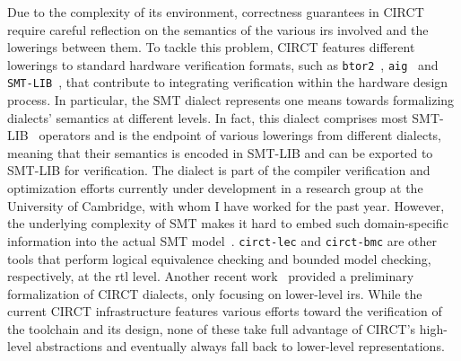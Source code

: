 \documentclass[sigconf,authorversion,nonacm, 11pt]{acmart}
\begin{document}
Due to the complexity of its environment, correctness guarantees in CIRCT require careful reflection on the semantics of the various \acp{ir} involved and the lowerings between them. 
To tackle this problem, CIRCT features different lowerings to standard hardware verification formats, such as \texttt{btor2}~\cite{btor2, niemetz2018btor2}, \texttt{aig}~\cite{aiger2} and \texttt{SMT-LIB}~\cite{barrett2010smt}, 
that contribute to integrating verification within the hardware design process.
In particular, the SMT dialect represents one means towards formalizing dialects' semantics at different levels. 
In fact, this dialect comprises most SMT-LIB~\cite{barrett2010smt} operators and is the endpoint of various lowerings from different dialects, 
meaning that their semantics is encoded in SMT-LIB and can be exported to SMT-LIB for verification.
The dialect is part of the compiler verification and optimization efforts currently under development in a research group at the 
University of Cambridge, with whom I have worked for the past year. 
However, the underlying complexity of SMT makes it hard to embed such domain-specific information into the actual SMT model~\cite{gurfinkel2022program}.
\texttt{circt-lec} and \texttt{circt-bmc} are other tools that perform logical equivalence checking and bounded model checking, respectively, at the \ac{rtl} level. 
Another recent work~\cite{zhao2024k} provided a preliminary formalization of CIRCT dialects, only focusing on lower-level \acp{ir}. 
While the current CIRCT infrastructure features various efforts toward the verification of the toolchain and its design, none of these 
take full advantage of CIRCT's high-level abstractions and eventually always fall back to lower-level representations.  
\end{document}

